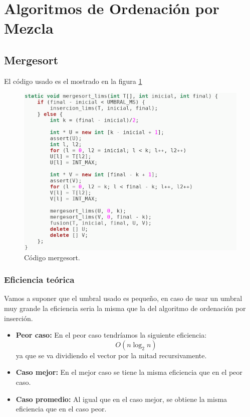 \section{Algoritmos de Ordenación por Mezcla}

\subsection{Mergesort}
El código usado es el mostrado en la figura  \ref{fig10}

\begin{figure}[H]
        \includegraphics[scale=0.7]{imagenes/merge.png}
        \caption{Código mergesort.}
        \label{fig10}
\end{figure}

\subsubsection{Eficiencia teórica}
Vamos a suponer que el umbral usado es pequeño, en caso de usar un umbral muy grande la eficiencia seria la misma que la del algoritmo de ordenación por inserción.
\begin{itemize}
  \item \textbf{Peor caso:} En el peor caso tendríamos la siguiente eficiencia:
  \begin{equation} O(n \log_2n ) \end{equation} ya que se va dividiendo el vector por la mitad recursivamente.
  
  \item \textbf{Caso mejor:} En el mejor caso se tiene la misma eficiencia que en el peor caso.
  \item \textbf{Caso promedio:} Al igual que en el caso mejor, se obtiene la misma eficiencia que en el caso peor.
\end{itemize}

